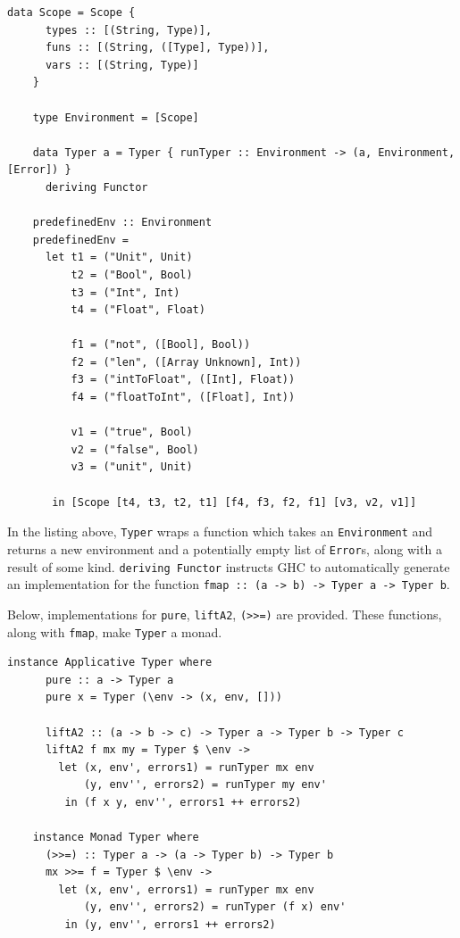 \documentclass[UdineBachThesis,american,11pt]{PhdThesis}
\begin{document}
  \begin{Verbatim}[gobble=4,fontsize=\small]
    data Scope = Scope {
      types :: [(String, Type)],
      funs :: [(String, ([Type], Type))],
      vars :: [(String, Type)]
    }

    type Environment = [Scope]

    data Typer a = Typer { runTyper :: Environment -> (a, Environment, [Error]) }
      deriving Functor

    predefinedEnv :: Environment
    predefinedEnv =
      let t1 = ("Unit", Unit)
          t2 = ("Bool", Bool)
          t3 = ("Int", Int)
          t4 = ("Float", Float)

          f1 = ("not", ([Bool], Bool))
          f2 = ("len", ([Array Unknown], Int))
          f3 = ("intToFloat", ([Int], Float))
          f4 = ("floatToInt", ([Float], Int))

          v1 = ("true", Bool)
          v2 = ("false", Bool)
          v3 = ("unit", Unit)

       in [Scope [t4, t3, t2, t1] [f4, f3, f2, f1] [v3, v2, v1]]
  \end{Verbatim}

  In the listing above, \mbox{\texttt{Typer}} wraps a function which takes an
  \mbox{\texttt{Environment}} and returns a new environment and a potentially
  empty list of \mbox{\texttt{Error}s}, along with a result of some kind.
  \mbox{\texttt{deriving Functor}} instructs GHC to automatically generate an
  implementation for the function
  \mbox{\texttt{fmap :: (a -> b) -> Typer a -> Typer b}}.

  Below, implementations for \mbox{\texttt{pure}}, \mbox{\texttt{liftA2}},
  \mbox{\texttt{(>>=)}} are provided. These functions, along with
  \mbox{\texttt{fmap}}, make \mbox{\texttt{Typer}} a monad.

  \begin{Verbatim}[gobble=4,fontsize=\small]
    instance Applicative Typer where
      pure :: a -> Typer a
      pure x = Typer (\env -> (x, env, []))

      liftA2 :: (a -> b -> c) -> Typer a -> Typer b -> Typer c
      liftA2 f mx my = Typer $ \env ->
        let (x, env', errors1) = runTyper mx env
            (y, env'', errors2) = runTyper my env'
         in (f x y, env'', errors1 ++ errors2)

    instance Monad Typer where
      (>>=) :: Typer a -> (a -> Typer b) -> Typer b
      mx >>= f = Typer $ \env ->
        let (x, env', errors1) = runTyper mx env
            (y, env'', errors2) = runTyper (f x) env'
         in (y, env'', errors1 ++ errors2)
  \end{Verbatim}
\end{document}
